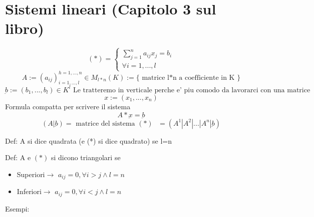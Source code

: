 \documentclass{article}
\begin{document}
\section{Sistemi lineari (Capitolo 3 sul libro)}
\begin{equation*}
	(*)=
	\begin{cases}
		\sum_{j=1}^n a_{ij} x_j = b_i \\
		\forall i=1,...,l
	\end{cases}
\end{equation*}
\begin{equation*}
	A := (a_{ij})^{h=1,...,n}_{i=1,...,l} \in M_{l*n}(K):=\{ \text{ matrice l*n a coefficiente in K } \}
\end{equation*}
\begin{equation*}
	\underbar{b}:=(b_1,...,b_l)\in K^l \text{ Le tratteremo in verticale perche e' piu comodo da lavorarci con una matrice}
\end{equation*}
\begin{equation*}
	x:=(x_1,...,x_n)
\end{equation*}
Formula compatta per scrivere il sistema
\begin{equation*}
	A*\underbar{x}=\underbar{b}
\end{equation*}
\begin{equation*}
	(A|\underbar{b})=\text{ matrice del sistema $(*)$ } = (A^1 | A^2| ... | A^n| \underbar{b})
\end{equation*}
\begin{flushleft}
	Def: A si dice quadrata (e (*) si dice quadrato) se l=n
\end{flushleft}
\begin{flushleft}
	Def: A e $(*)$ si dicono triangolari se
\end{flushleft}
\begin{itemize}
	\item Superiori$\to$ $a_{ij}=0, \forall i>j \land l=n$
	\item Inferiori$\to$ $a_{ij}=0, \forall i<j \land l=n$
\end{itemize}
Esempi:
\end{document}
